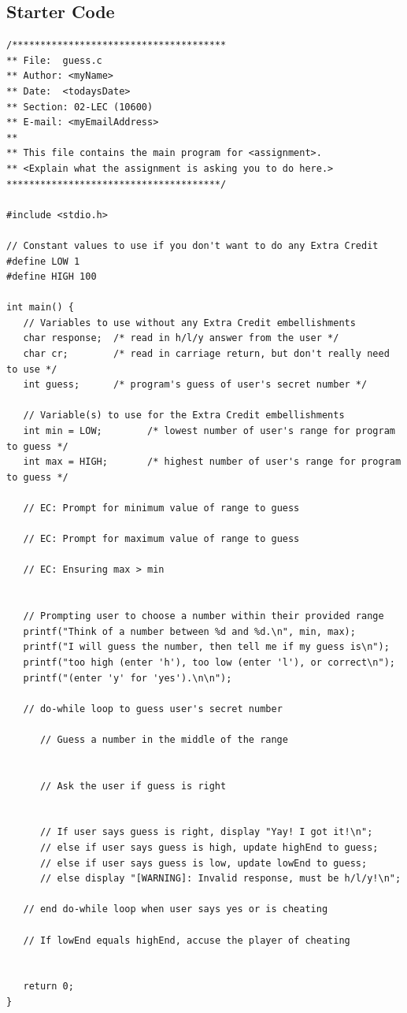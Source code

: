 \documentclass[letter,11pt]{article}
\begin{document}
\subsection*{Starter Code}
\begin{verbatim}
/**************************************
** File:  guess.c
** Author: <myName>
** Date:  <todaysDate>
** Section: 02-LEC (10600)
** E-mail: <myEmailAddress>
**
** This file contains the main program for <assignment>.
** <Explain what the assignment is asking you to do here.>
**************************************/

#include <stdio.h>

// Constant values to use if you don't want to do any Extra Credit
#define LOW 1
#define HIGH 100

int main() {
   // Variables to use without any Extra Credit embellishments
   char response;  /* read in h/l/y answer from the user */
   char cr;        /* read in carriage return, but don't really need to use */
   int guess;      /* program's guess of user's secret number */

   // Variable(s) to use for the Extra Credit embellishments
   int min = LOW;        /* lowest number of user's range for program to guess */
   int max = HIGH;       /* highest number of user's range for program to guess */

   // EC: Prompt for minimum value of range to guess

   // EC: Prompt for maximum value of range to guess
   
   // EC: Ensuring max > min


   // Prompting user to choose a number within their provided range
   printf("Think of a number between %d and %d.\n", min, max);
   printf("I will guess the number, then tell me if my guess is\n");
   printf("too high (enter 'h'), too low (enter 'l'), or correct\n");
   printf("(enter 'y' for 'yes').\n\n");

   // do-while loop to guess user's secret number
   
      // Guess a number in the middle of the range
      

      // Ask the user if guess is right
      

      // If user says guess is right, display "Yay! I got it!\n";
      // else if user says guess is high, update highEnd to guess;
      // else if user says guess is low, update lowEnd to guess;
      // else display "[WARNING]: Invalid response, must be h/l/y!\n";
      
   // end do-while loop when user says yes or is cheating

   // If lowEnd equals highEnd, accuse the player of cheating
   

   return 0;
}
\end{verbatim}
\end{document}
